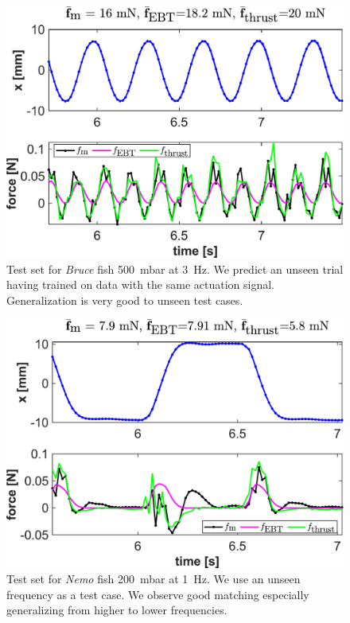 \begin{figure}[h]
    \centering
    \includegraphics[width=0.8\columnwidth]{figures_appendix/error_analysis_500_mbar_3_Hz.pdf}
    \caption{Test set for \emph{Bruce} fish \SI{500}{mbar} at \SI{3}{Hz}. We predict an unseen trial having trained on data with the same actuation signal. Generalization is very good to unseen test cases.}
    \label{fig:Bruce3}
\end{figure}
\begin{figure}[h]
    \centering
    \includegraphics[width=0.8\columnwidth]{figures_appendix/error_analysis_200_mbar_1_Hz.pdf}
    \caption{Test set for \emph{Nemo} fish \SI{200}{mbar} at \SI{1}{Hz}. We use an unseen frequency as a test case. We observe good matching especially generalizing from higher to lower frequencies.}
    \label{fig:Nemo1}
\end{figure}
